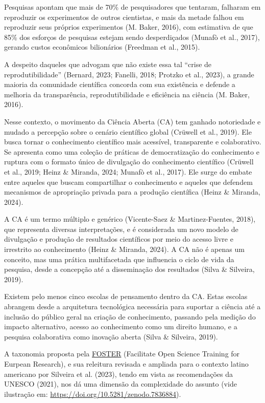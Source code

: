 \documentclass[
  a4paper,
]{book}
\begin{document}
Pesquisas apontam que mais de 70\% de pesquisadores que tentaram,
falharam em reproduzir os experimentos de outros cientistas, e mais da
metade falhou em reproduzir seus próprios experimentos (M. Baker, 2016),
com estimativa de que 85\% dos esforços de pesquisas estejam sendo
desperdiçados (Munafò et al., 2017), gerando custos econômicos
bilionários (Freedman et al., 2015).

A despeito daqueles que advogam que não existe essa tal ``crise de
reprodutibilidade'' (Bernard, 2023; Fanelli, 2018; Protzko et al.,
2023), a grande maioria da comunidade científica concorda com sua
existência e defende a melhoria da transparência, reprodutibilidade e
eficiência na ciência (M. Baker, 2016).

Nesse contexto, o movimento da Ciência Aberta (CA) tem ganhado
notoriedade e mudado a percepção sobre o cenário científico global
(Crüwell et al., 2019). Ele busca tornar o conhecimento científico mais
acessível, transparente e colaborativo. Se apresenta como uma coleção de
práticas de democratização do conhecimento e ruptura com o formato único
de divulgação do conhecimento científico (Crüwell et al., 2019; Heinz \&
Miranda, 2024; Munafò et al., 2017). Ele surge do embate entre aqueles
que buscam compartilhar o conhecimento e aqueles que defendem mecanismos
de apropriação privada para a produção científica (Heinz \& Miranda,
2024).

A CA é um termo múltiplo e genérico (Vicente-Saez \& Martinez-Fuentes,
2018), que representa diversas interpretações, e é considerada um novo
modelo de divulgação e produção de resultados científicos por meio do
acesso livre e irrestrito ao conhecimento (Heinz \& Miranda, 2024). A CA
não é apenas um conceito, mas uma prática multifacetada que influencia o
ciclo de vida da pesquisa, desde a concepção até a disseminação dos
resultados (Silva \& Silveira, 2019).

Existem pelo menos cinco escolas de pensamento dentro da CA. Estas
escolas abrangem desde a arquitetura tecnológica necessária para
suportar a ciência até a inclusão do público geral na criação de
conhecimento, passando pela medição do impacto alternativo, acesso ao
conhecimento como um direito humano, e a pesquisa colaborativa como
inovação aberta (Silva \& Silveira, 2019).

A taxonomia proposta pela
\href{https://www.fosteropenscience.eu/foster-taxonomy/open-workflow-tools}{FOSTER}
(Facilitate Open Science Training for Eurpean Research), e sua releitura
revisada e ampliada para o contexto latino americano por Silveira et al.
(2023), tendo em vista as recomendações da UNESCO (2021), nos dá uma
dimensão da complexidade do assunto (vide ilustração em:
\url{https://doi.org/10.5281/zenodo.7836884}).
\end{document}
